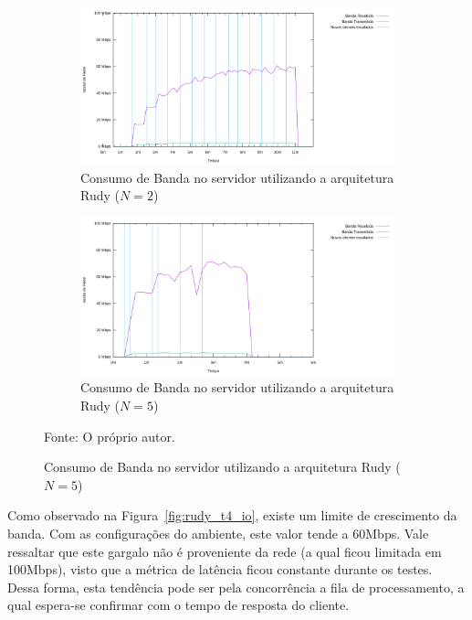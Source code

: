 \begin{figure}[htb!]
    \caption{Consumo de Banda no servidor utilizando a arquitetura Rudy ($N=2$ e $N=5$)}
    \centering
    \begin{subfigure}{1.0\textwidth}
      \centering
      \includegraphics[width=.9\textwidth]{metricas_rudy_t5/io.png}
      \caption{Consumo de Banda no servidor utilizando a arquitetura Rudy ($N=2$)}
      \label{fig:rudy_t5_io}
    \end{subfigure}


    \begin{subfigure}{1.0\textwidth}
      \centering
      \includegraphics[width=.9\textwidth]{metricas_rudy_t6/io.png}
      \caption{Consumo de Banda no servidor utilizando a arquitetura Rudy ($N=5$)}
      \label{fig:rudy_t6_io}
    \end{subfigure}
    \label{fig:rudy_t56_io}

    Fonte: O próprio autor.
\end{figure}

Como observado na Figura~\ref{fig:rudy_t4_io}, existe um limite de crescimento da banda.
%
Com as configurações do ambiente, este valor tende a 60Mbps.
%
Vale ressaltar que este gargalo não é proveniente da rede (a qual ficou limitada em 100Mbps), visto que a métrica de latência ficou constante durante os testes.
%
Dessa forma, esta tendência pode ser pela concorrência a fila de processamento, a qual espera-se confirmar com o tempo de resposta do cliente.


